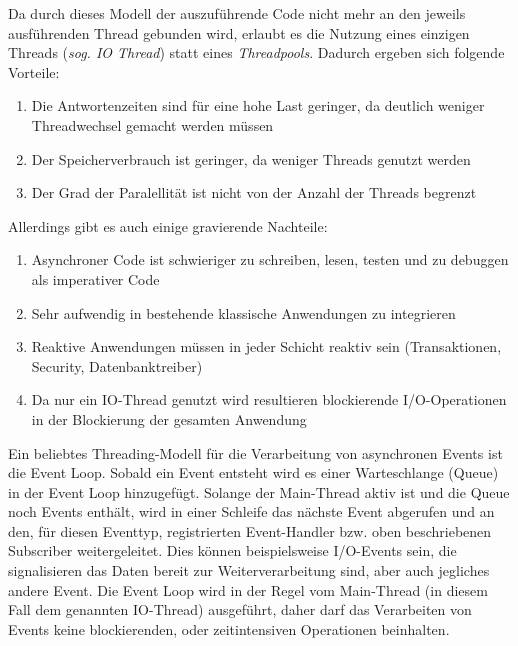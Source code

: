 Da durch dieses Modell der auszuführende Code nicht mehr an den jeweils ausführenden Thread gebunden wird, erlaubt es die Nutzung eines einzigen
Threads (\textit{sog. IO Thread}) statt eines \textit{Threadpools}.
Dadurch ergeben sich folgende Vorteile:

\begin{enumerate}
    \item Die Antwortenzeiten sind für eine hohe Last geringer, da deutlich weniger Threadwechsel gemacht werden müssen
    \item Der Speicherverbrauch ist geringer, da weniger Threads genutzt werden
    \item Der Grad der Paralellität ist nicht von der Anzahl der Threads begrenzt
\end{enumerate}

Allerdings gibt es auch einige gravierende Nachteile:

\begin{enumerate}
    \item Asynchroner Code ist schwieriger zu schreiben, lesen, testen und zu debuggen als imperativer Code
    \item Sehr aufwendig in bestehende klassische Anwendungen zu integrieren
    \item Reaktive Anwendungen müssen in jeder Schicht reaktiv sein (Transaktionen, Security, Datenbanktreiber)
    \item Da nur ein IO-Thread genutzt wird resultieren blockierende I/O-Operationen in der Blockierung der gesamten Anwendung
\end{enumerate}

Ein beliebtes Threading-Modell für die Verarbeitung von asynchronen Events ist die Event Loop. Sobald ein Event entsteht wird es einer Warteschlange (Queue)
in der Event Loop hinzugefügt. Solange der Main-Thread aktiv ist und die Queue noch Events enthält, wird in einer Schleife das nächste Event
abgerufen und an den, für diesen Eventtyp, registrierten Event-Handler bzw. oben beschriebenen Subscriber weitergeleitet.
Dies können beispielsweise I/O-Events sein, die signalisieren das Daten bereit zur Weiterverarbeitung sind, aber auch jegliches andere Event.
Die Event Loop wird in der Regel vom Main-Thread (in diesem Fall dem genannten IO-Thread) ausgeführt, daher darf das Verarbeiten von Events
keine blockierenden, oder zeitintensiven Operationen beinhalten\parencite{Ponge2020}.

